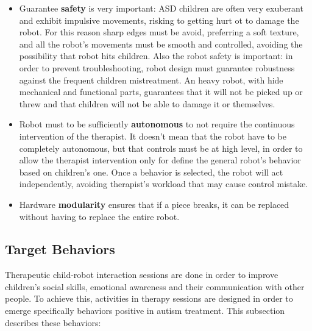 \begin{itemize}
	\item Guarantee \textbf{safety} is very important: ASD children are often very exuberant and exhibit impulsive movements, risking to getting hurt ot to damage the robot. For this reason sharp edges must be avoid, preferring a soft texture, and all the robot's movements must be smooth and controlled, avoiding the possibility that robot hits children. Also the robot safety is important: in order to prevent troubleshooting, robot design must guarantee robustness against the frequent children mistreatment. An heavy robot, with hide mechanical and functional parts, guarantees that it will not be picked up or threw and that children will not be able to damage it or themselves.
	
	\item Robot must to be  sufficiently \textbf{autonomous} to not require the continuous intervention of the therapist. It doesn't mean that the robot have to be completely autonomous, but that controls must be at high level, in order to allow the therapist intervention only for define the general robot's behavior based on children's one. Once a behavior is selected, the robot will act independently, avoiding therapist's workload that may cause control mistake.
	
	\item Hardware \textbf{modularity} ensures that if a piece breaks, it can be replaced without having to replace the entire robot.
\end{itemize}
	

\subsection{Target Behaviors}
\label{targetBe}
Therapeutic child-robot interaction sessions are done in order to improve children's social skills, emotional awareness and their communication with other people. To achieve this, activities in therapy sessions are designed in order to emerge specifically behaviors positive in autism treatment.
This subsection describes these behaviors:

